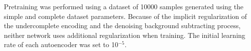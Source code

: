 Pretraining was performed using a dataset of 10000 samples generated using the simple and complete dataset parameters. Because of the implicit regularization of the undercomplete encoding and the denoising background subtracting process, neither network uses additional regularization when training. The initial learning rate of each autoencoder was set to 10$^{-5}$.















